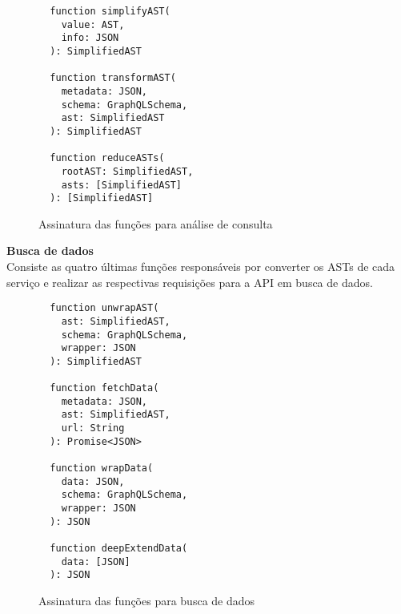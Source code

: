 \begin{figure}[H]
  \centering
  \begin{verbatim}
  function simplifyAST(
    value: AST,
    info: JSON
  ): SimplifiedAST

  function transformAST(
    metadata: JSON,
    schema: GraphQLSchema,
    ast: SimplifiedAST
  ): SimplifiedAST

  function reduceASTs(
    rootAST: SimplifiedAST,
    asts: [SimplifiedAST]
  ): [SimplifiedAST]
  \end{verbatim}
  \caption{Assinatura das funções para análise de consulta}
\end{figure}

\textbf{Busca de dados} \\

Consiste as quatro últimas funções responsáveis por converter os ASTs de cada serviço e realizar as respectivas requisições para a API em busca de dados.

\begin{figure}[H]
  \centering
  \begin{verbatim}
  function unwrapAST(
    ast: SimplifiedAST,
    schema: GraphQLSchema,
    wrapper: JSON
  ): SimplifiedAST

  function fetchData(
    metadata: JSON,
    ast: SimplifiedAST,
    url: String
  ): Promise<JSON>

  function wrapData(
    data: JSON,
    schema: GraphQLSchema,
    wrapper: JSON
  ): JSON

  function deepExtendData(
    data: [JSON]
  ): JSON
  \end{verbatim}
  \caption{Assinatura das funções para busca de dados}
\end{figure}
